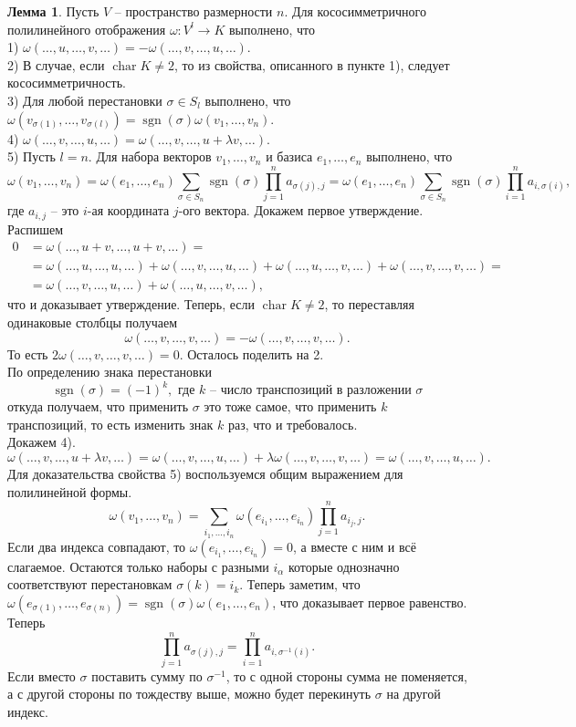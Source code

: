 \documentclass[10pt,a4paper,oneside]{book}
\theoremstyle{definition}
\newtheorem{lem}{\color{green!50!black}Лемма}
\newcommand{\chr}{\operatorname{char}}
\newcommand{\sgn}{\operatorname{sgn}}
\def\lm{\begin{lem}}
\def\elm{\end{lem}}
\begin{document}
\lm Пусть $V$ -- пространство размерности $n$. Для кососимметричного полилинейного отображения $\omega \colon V^l \to K $ выполнено, что \\
1) $\omega(\dots,u,\dots,v,\dots)= -\omega(\dots,v,\dots,u,\dots)$.\\
2) В случае, если $\chr K \neq 2$, то из  свойства, описанного в пункте 1), следует кососимметричность.\\
3) Для любой перестановки $\sigma \in S_l$ выполнено, что $\omega(v_{\sigma(1)},\dots,v_{\sigma(l)})= \sgn(\sigma) \omega(v_1,\dots,v_n)$.\\
4)  $\omega(\dots,v,\dots,u,\dots)=\omega(\dots,v,\dots,u+\lambda v,\dots)$.\\
5) Пусть $l=n$. Для набора векторов $v_1,\dots,v_n$ и базиса $e_1,\dots,e_n$ выполнено, что
$$\omega(v_1,\dots,v_n)=\omega(e_1,\dots,e_n)\sum_{\sigma \in S_n} \sgn(\sigma)\prod_{j=1}^n a_{\sigma(j),j}=\omega(e_1,\dots,e_n)\sum_{\sigma \in S_n} \sgn(\sigma)\prod_{i=1}^n a_{i,\sigma(i)},$$
где $a_{i,j}$ -- это $i$-ая координата $j$-ого вектора.
\proof Докажем первое утверждение. Распишем 
\begin{align*} 
0&=\omega(\dots,u+v,\dots,u+v,\dots)=\\&=\omega(\dots,u,\dots,u,\dots)+\omega(\dots,v,\dots,u,\dots)+\omega(\dots,u,\dots,v,\dots)+\omega(\dots,v,\dots,v,\dots)=\\ &=\omega(\dots,v,\dots,u,\dots)+\omega(\dots,u,\dots,v,\dots),
\end{align*}
что и доказывает утверждение. Теперь, если $\chr K\neq 2$, то переставляя одинаковые столбцы получаем $$\omega(\dots,v,\dots,v,\dots)=-\omega(\dots,v,\dots,v,\dots).$$
То есть $2\omega(\dots,v,\dots,v,\dots)=0$. Осталось поделить на 2.\\
По определению знака перестановки $$\sgn(\sigma)=(-1)^{k}, \text{ где $k$ -- число транспозиций в разложении $\sigma$}$$
откуда получаем, что применить $\sigma$ это тоже самое, что применить $k$ транспозиций, то есть изменить знак $k$ раз, что и требовалось.\\
Докажем 4). $$\omega(\dots,v,\dots,u+\lambda v,\dots)=\omega(\dots,v,\dots,u,\dots)+\lambda\omega(\dots,v,\dots, v,\dots)=\omega(\dots,v,\dots,u,\dots).$$
Для доказательства свойства 5) воспользуемся общим выражением для полилинейной формы.
$$\omega(v_1,\dots,v_n)=\sum_{i_1,\dots,i_n} \omega(e_{i_1},\dots,e_{i_n}) \prod_{j=1}^n a_{i_j,j}.$$
Если два индекса совпадают, то $\omega(e_{i_1},\dots,e_{i_n})=0$, а вместе с ним и всё слагаемое. Остаются только наборы с разными $i_{\alpha}$ которые однозначно соответствуют перестановкам $\sigma(k)=i_k$. Теперь заметим, что $\omega(e_{\sigma(1)},\dots,e_{\sigma(n)})=\sgn(\sigma)\omega(e_1,\dots,e_n)$, что доказывает первое равенство. \\
Теперь $$\prod_{j=1}^n a_{\sigma(j),j}=\prod_{i=1}^n a_{i,\sigma^{-1}(i)}.$$ Если вместо $\sigma$ поставить сумму по $\sigma^{-1}$, то с одной стороны сумма не поменяется, а с другой стороны по тождеству выше, можно будет перекинуть $\sigma$ на другой индекс.
\endproof
\elm
\end{document}
